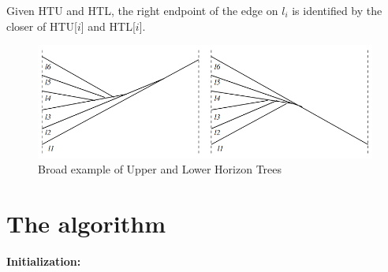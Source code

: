 \documentclass[12pt]{article}
\begin{document}
        Given HTU and HTL, the right endpoint of the edge on $l_{i}$ is
        identified by the closer of HTU[$i$] and HTL[$i$].

        \begin{figure}
            \center
            \includegraphics[width=\textwidth]{upperlower.png}
            \caption{Broad example of Upper and Lower Horizon Trees}
            \label{figure.upperlower}
        \end{figure}


    \newpage



        \section{The algorithm} %
        \label{sec:algo}

        {\bf Initialization:}
\end{document}
